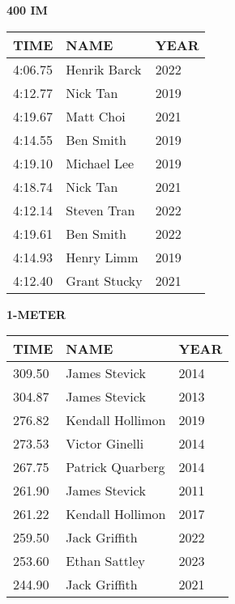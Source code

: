 \begin{center}
\begin{minipage}[t]{0.7\textwidth}
\centering
\textbf{400 IM}\\[0.05cm]
\begin{tabular}{@{}p{1.8cm}p{2.8cm}p{1.2cm}@{}}
\hline
\textbf{TIME} & \textbf{NAME} & \textbf{YEAR} \\
\hline
4:06.75 & Henrik Barck & 2022 \\
4:12.77 & Nick Tan & 2019 \\
4:19.67 & Matt Choi & 2021 \\
4:14.55 & Ben Smith & 2019 \\
4:19.10 & Michael Lee & 2019 \\
4:18.74 & Nick Tan & 2021 \\
4:12.14 & Steven Tran & 2022 \\
4:19.61 & Ben Smith & 2022 \\
4:14.93 & Henry Limm & 2019 \\
4:12.40 & Grant Stucky & 2021 \\
\hline
\end{tabular}
\end{minipage}
\end{center}

\vspace{0.4cm}

\begin{center}
\begin{minipage}[t]{0.7\textwidth}
\centering
\textbf{1-METER}\\[0.05cm]
\begin{tabular}{@{}p{1.8cm}p{2.8cm}p{1.2cm}@{}}
\hline
\textbf{TIME} & \textbf{NAME} & \textbf{YEAR} \\
\hline
309.50 & James Stevick & 2014 \\
304.87 & James Stevick & 2013 \\
276.82 & Kendall Hollimon & 2019 \\
273.53 & Victor Ginelli & 2014 \\
267.75 & Patrick Quarberg & 2014 \\
261.90 & James Stevick & 2011 \\
261.22 & Kendall Hollimon & 2017 \\
259.50 & Jack Griffith & 2022 \\
253.60 & Ethan Sattley & 2023 \\
244.90 & Jack Griffith & 2021 \\
\hline
\end{tabular}
\end{minipage}
\end{center}

